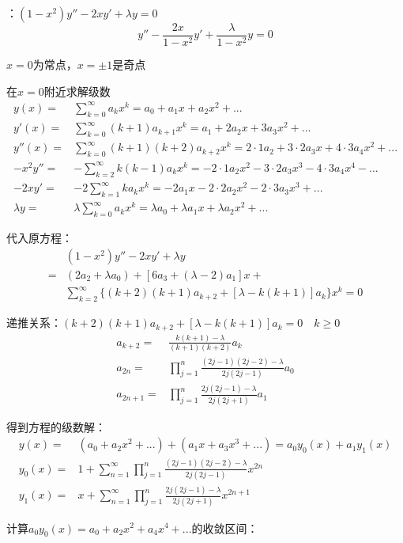 \begin{ex}[Legendre方程的本征值问题]\label{LegendreEigenValue}
：$(1-x^2)y''-2xy'+\lambda y=0$
$$y''-\frac{2x}{1-x^2}y'+\frac{\lambda}{1-x^2} y=0$$

$x=0$为常点，$x=\pm1$是奇点

在$x=0$附近求解级数
$$\begin{aligned}
y(x)=&\sum_{k=0}^{\infty}a_kx^k=a_0+a_1x+a_2x^2+...\\
y'(x)=&\sum_{k=0}^{\infty}(k+1)a_{k+1}x^{k}=a_1+2a_2x+3a_3x^2+...\\
y''(x)=&\sum_{k=0}^{\infty}(k+1)(k+2)a_{k+2}x^{k}=2\cdot1a_2+3\cdot2a_3x+4\cdot3a_4x^2+...\\
-x^2y''=&-\sum_{k=2}^{\infty}k(k-1)a_{k}x^{k}=-2\cdot1a_2x^2-3\cdot2a_3x^3-4\cdot3a_4x^4-...\\
-2xy'=&-2\sum_{k=1}^{\infty}ka_{k}x^{k}=-2a_1x-2\cdot2a_2x^2-2\cdot3a_3x^3+...\\
\lambda y=&\lambda\sum_{k=0}^{\infty}a_kx^k=\lambda a_0+\lambda a_1x+\lambda a_2x^2+...
\end{aligned}$$

代入原方程：
$$\begin{aligned}
&(1-x^2)y''-2xy'+\lambda y\\
=&(2a_2+\lambda a_0)+[6a_3+(\lambda-2)a_1]x+\\
&\sum_{k=2}^\infty\{(k+2)(k+1)a_{k+2}+[\lambda-k(k+1)]a_k\}x^k=0
\end{aligned}$$

递推关系：$(k+2)(k+1)a_{k+2}+[\lambda-k(k+1)]a_k=0\quad k\ge0$
$$\begin{aligned}
a_{k+2}=&\frac{k(k+1)-\lambda}{(k+1)(k+2)}a_k\\
a_{2n}=&\prod_{j=1}^n\frac{(2j-1)(2j-2)-\lambda}{2j(2j-1)}a_0\\
a_{2n+1}=&\prod_{j=1}^n\frac{2j(2j-1)-\lambda}{2j(2j+1)}a_1
\end{aligned}$$

得到方程的级数解：
$$\begin{aligned}
y(x)=&(a_0+a_2x^2+...)+(a_1x+a_3x^3+...)=a_0y_0(x)+a_1y_1(x)\\
y_0(x)=&1+\sum_{n=1}^\infty\prod_{j=1}^n\frac{(2j-1)(2j-2)-\lambda}{2j(2j-1)}x^{2n}\\
y_1(x)=&x+\sum_{n=1}^\infty\prod_{j=1}^n\frac{2j(2j-1)-\lambda}{2j(2j+1)}x^{2n+1}
\end{aligned}$$

计算$a_0y_0(x)=a_0+a_2x^2+a_4x^4+...$的收敛区间：


\end{ex}
